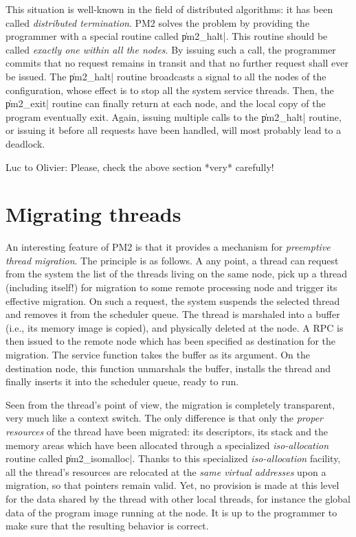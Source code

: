 This situation is well-known in the field of distributed algorithms:
it has been called \emph{distributed termination}. PM2 solves the
problem by providing the programmer with a special routine called
\|pm2_halt|.  This routine should be called \emph{exactly one within
  all the nodes}. By issuing such a call, the programmer commits that
no request remains in transit and that no further request shall ever
be issued. The \|pm2_halt| routine broadcasts a signal to all the
nodes of the configuration, whose effect is to stop all the system
service threads. Then, the \|pm2_exit| routine can finally return at each
node, and the local copy of the program eventually exit. Again,
issuing multiple calls to the \|pm2_halt| routine, or issuing it
before all requests have been handled, will most probably lead to a
deadlock.

\begin{note}
  Luc to Olivier: Please, check the above section *very* carefully!
\end{note}

\section{Migrating threads}

An interesting feature of PM2 is that it provides a mechanism for
\emph{preemptive thread migration}. The principle is as follows. A any
point, a thread can request from the system the list of the threads
living on the same node, pick up a thread (including itself!)  for
migration to some remote processing node and trigger its effective
migration.  On such a request, the system suspends the selected thread
and removes it from the scheduler queue. The thread is marshaled
into a buffer (i.e., its memory image is copied), and physically
deleted at the node. A RPC is then issued to the remote node which has
been specified as destination for the migration. The service function
takes the buffer as its argument. On the destination node, this
function unmarshals the buffer, installs the thread and finally
inserts it into the scheduler queue, ready to run.

Seen from the thread's point of view, the migration is completely
transparent, very much like a context switch. The only difference is
that only the \emph{proper resources} of the thread have been
migrated: its descriptors, its stack and the memory areas which have
been allocated through a specialized \emph{iso-allocation} routine
called \|pm2_isomalloc|.  Thanks to this specialized
\emph{iso-allocation} facility, all the thread's resources are
relocated at the \emph{same virtual addresses} upon a migration, so
that pointers remain valid.  Yet, no provision is made at this level
for the data shared by the thread with other local threads, for
instance the global data of the program image running at the node. It
is up to the programmer to make sure that the resulting behavior is
correct.

